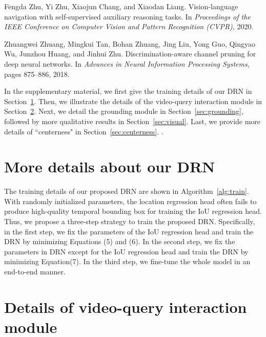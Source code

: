 \documentclass[10pt,twocolumn,letterpaper]{article}
\begin{document}
\begin{thebibliography}{10}
	Fengda Zhu, Yi Zhu, Xiaojun Chang, and Xiaodan Liang.
	\newblock Vision-language navigation with self-supervised auxiliary reasoning
	tasks.
	\newblock In {\em Proceedings of the IEEE Conference on Computer Vision and
		Pattern Recognition (CVPR)}, 2020.
	
	Zhuangwei Zhuang, Mingkui Tan, Bohan Zhuang, Jing Liu, Yong Guo, Qingyao Wu,
	Junzhou Huang, and Jinhui Zhu.
	\newblock Discrimination-aware channel pruning for deep neural networks.
	\newblock In {\em Advances in Neural Information Processing Systems}, pages
	875--886, 2018.
	
\end{thebibliography}

\newpage
\normalsize
\setcounter{section}{0}
\renewcommand\thesection{\Alph{section}}
\setcounter{figure}{0}
\renewcommand\thefigure{\Alph{figure}}
\setcounter{table}{0}
\renewcommand\thetable{\Alph{table}}



In the supplementary material, we first give the training details of our DRN in Section~\ref{sec:training}. Then, we
illustrate the details of the video-query interaction module in Section~\ref{sec:feature}. Next, we detail the grounding module in Section~\ref{sec:grounding}, followed by more qualitative results in Section~\ref{sec:visual}.
Last, we provide more details of ``centerness" in Section~\ref{sec:centerness}.  .


\section{More details about our DRN}
\label{sec:training}

The training details of our proposed DRN are shown in Algorithm~\ref{alg:train}. With randomly initialized parameters, the location regression head often fails to produce high-quality temporal bounding box for training the IoU regression head. Thus, we propose a three-step strategy to train the proposed DRN.
Specifically, in the first step, we fix the parameters of the IoU regression head and train the DRN by minimizing Equations (5) and (6). In the second step, we fix the parameters in DRN except for the IoU regression head and train the DRN by minimizing Equation(7). In the third step, we fine-tune the whole model in an end-to-end manner.

\section{Details of video-query interaction module}
\label{sec:feature}
\end{document}
